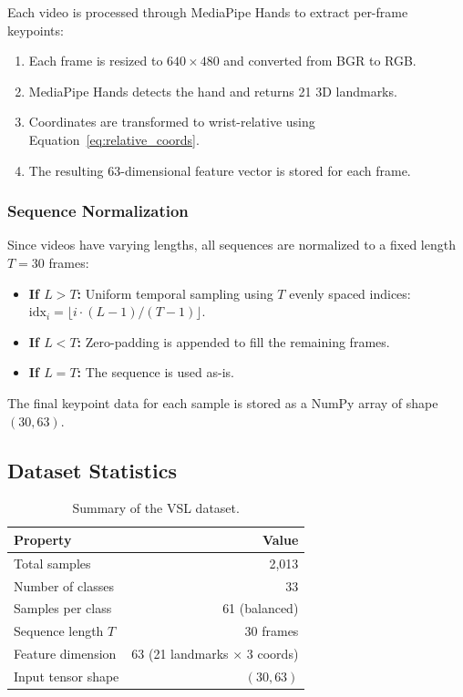 \documentclass[12pt, a4paper]{article}
\begin{document}
Each video is processed through MediaPipe Hands to extract per-frame keypoints:

\begin{enumerate}
    \item Each frame is resized to $640 \times 480$ and converted from BGR to RGB.
    \item MediaPipe Hands detects the hand and returns 21 3D landmarks.
    \item Coordinates are transformed to wrist-relative using Equation~\eqref{eq:relative_coords}.
    \item The resulting 63-dimensional feature vector is stored for each frame.
\end{enumerate}

\subsubsection{Sequence Normalization}

Since videos have varying lengths, all sequences are normalized to a fixed length $T = 30$ frames:

\begin{itemize}
    \item \textbf{If $L > T$:} Uniform temporal sampling using $T$ evenly spaced indices: $\text{idx}_i = \lfloor i \cdot (L-1) / (T-1) \rfloor$.
    \item \textbf{If $L < T$:} Zero-padding is appended to fill the remaining frames.
    \item \textbf{If $L = T$:} The sequence is used as-is.
\end{itemize}

The final keypoint data for each sample is stored as a NumPy array of shape $(30, 63)$.

\subsection{Dataset Statistics}

\begin{table}[H]
    \centering
    \caption{Summary of the VSL dataset.}
    \label{tab:dataset_stats}
    \begin{tabular}{lr}
        \toprule
        \textbf{Property} & \textbf{Value} \\
        \midrule
        Total samples & 2{,}013 \\
        Number of classes & 33 \\
        Samples per class & 61 (balanced) \\
        Sequence length $T$ & 30 frames \\
        Feature dimension & 63 (21 landmarks $\times$ 3 coords) \\
        Input tensor shape & $(30, 63)$ \\
        \bottomrule
    \end{tabular}
\end{table}
\end{document}

